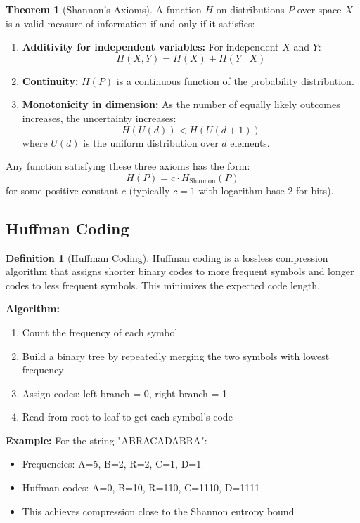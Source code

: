\documentclass[12pt,a4paper]{article}
\theoremstyle{definition}
\newtheorem{definition}{Definition}[section]
\newtheorem{theorem}{Theorem}[section]
\begin{document}
\begin{theorem}[Shannon's Axioms]
A function $H$ on distributions $P$ over space $X$ is a valid measure of information if and only if it satisfies:

\begin{enumerate}
    \item \textbf{Additivity for independent variables:} For independent $X$ and $Y$:
    \[
    H(X, Y) = H(X) + H(Y \mid X)
    \]
    
    \item \textbf{Continuity:} $H(P)$ is a continuous function of the probability distribution.
    
    \item \textbf{Monotonicity in dimension:} As the number of equally likely outcomes increases, the uncertainty increases:
    \[
    H(U(d)) < H(U(d+1))
    \]
    where $U(d)$ is the uniform distribution over $d$ elements.
\end{enumerate}

Any function satisfying these three axioms has the form:
\[
H(P) = c \cdot H_{\text{Shannon}}(P)
\]
for some positive constant $c$ (typically $c=1$ with logarithm base 2 for bits).
\end{theorem}

\subsection{Huffman Coding}

\begin{definition}[Huffman Coding]
Huffman coding is a lossless compression algorithm that assigns shorter binary codes to more frequent symbols and longer codes to less frequent symbols. This minimizes the expected code length.

\textbf{Algorithm:}
\begin{enumerate}
    \item Count the frequency of each symbol
    \item Build a binary tree by repeatedly merging the two symbols with lowest frequency
    \item Assign codes: left branch = 0, right branch = 1
    \item Read from root to leaf to get each symbol's code
\end{enumerate}

\textbf{Example:} For the string "ABRACADABRA":
\begin{itemize}
    \item Frequencies: A=5, B=2, R=2, C=1, D=1
    \item Huffman codes: A=0, B=10, R=110, C=1110, D=1111
    \item This achieves compression close to the Shannon entropy bound
\end{itemize}
\end{definition}
\end{document}
